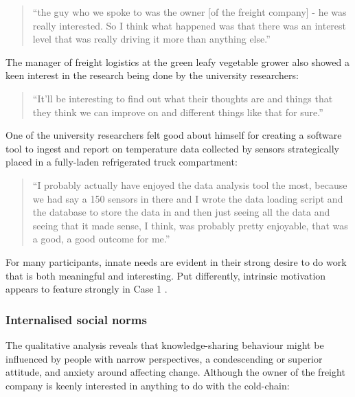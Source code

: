 \begin{quote}
\small
\enquote{the guy who we spoke to was the owner [of the freight company] - he was really interested. So I think what happened was that there was an interest level that was really driving it more than anything else.} \\
\end{quote}

The manager of freight logistics at the green leafy vegetable grower also showed a keen interest in the research being done by the university researchers:

\begin{quote}
\small
\enquote{It'll be interesting to find out what their thoughts are and things that they think we can improve on and different things like that for sure.} \\
\end{quote}

One of the university researchers felt good about himself for creating a software tool to ingest and report on temperature data collected by sensors strategically placed in a fully-laden refrigerated truck compartment:

\begin{quote}
\small
\enquote{I probably actually have enjoyed the data analysis tool the most, because we had say a 150 sensors in there and I wrote the data loading script and the database to store the data in and then just seeing all the data and seeing that it made sense, I think, was probably pretty enjoyable, that was a good, a good outcome for me.} \\
\end{quote}

For many participants, innate needs are evident in their strong desire to do work that is both meaningful and interesting. Put differently, intrinsic motivation appears to feature strongly in Case 1 \citep{ryan2000intrinsic}. 

\subsubsection{Internalised social norms}

The qualitative analysis reveals that knowledge-sharing behaviour might be influenced by people with narrow perspectives, a condescending or superior attitude, and anxiety around affecting change. Although the owner of the freight company is keenly interested in anything to do with the cold-chain:

